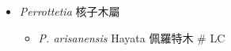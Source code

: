 
  \begin{itemize}
 \item[] \textit{Perrottetia} 核子木屬
                                
  \begin{itemize}
        \item[] \textit{P. arisanensis} Hayata  佩羅特木  \# LC
  \end{itemize}
  \end{itemize}
